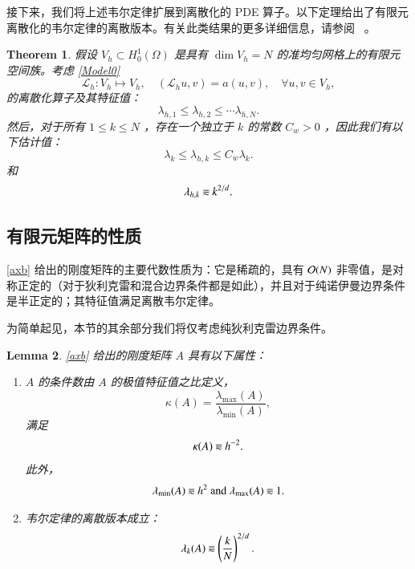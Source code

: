 \documentclass[12pt]{acta_2011xz}
\newcommand{\eqqsim}{\mathbin{\rotatebox[origin=c]{180}{\ensuremath{\cong}}}}
\newtheorem{theorem}{Theorem}[section]
\newtheorem{lemma}[theorem]{Lemma}
\begin{document}
接下来，我们将上述韦尔定律扩展到离散化的 PDE 算子。以下定理给出了有限元离散化的韦尔定律的离散版本。有关此类结果的更多详细信息，请参阅~    \cite{Weyl}    。  

   \begin{theorem}   \label{thm:WeylFE}    假设    $V_h\subset H_0^1({\Omega})$    是具有    $\dim V_h = N$    的准均匀网格上的有限元空间族。考虑    \eqref{Model0}    
   \begin{equation*}
    \mathcal L_h: V_h\mapsto V_h, \quad (\mathcal L_h u, v) = a(u, v), \quad \forall u, v\in V_h,
\end{equation*}    的离散化算子及其特征值：
   \[
\lambda_{h,1}\le \lambda_{h,2}\le \cdots \lambda_{h,N}.
\]    然后，对于所有
   $1\le k\le N$    ，存在一个独立于    $k$    的常数    $C_w>0$    ，因此我们有以下估计值：
   \begin{equation}\label{e:discrete-continuous}
        \lambda_k\le\lambda_{h,k}\le C_w\lambda_k.
    \end{equation}    和 
   \begin{equation}\label{discrete-Weyl}
        \lambda_{h,k}\eqqsim k^{2/d}.
    \end{equation}     \end{theorem}     

   \subsection{有限元矩阵的性质  }       \eqref{axb}    给出的刚度矩阵的主要代数性质为：它是稀疏的，具有    ${\cal O}(N)$    非零值，是对称正定的（对于狄利克雷和混合边界条件都是如此），并且对于纯诺伊曼边界条件是半正定的；其特征值满足离散韦尔定律。  

为简单起见，本节的其余部分我们将仅考虑纯狄利克雷边界条件。
   \begin{lemma}   \label{lm:stiffness}       \eqref{axb}    给出的刚度矩阵    $A$    具有以下属性：
   \begin{enumerate}

   \item            $A$          的条件数由          $A$          的极值特征值之比定义，
         $$
\kappa(A)=\frac{\lambda_{\max}(A)}{\lambda_{\min}(A)},
$$          满足
         $$
\kappa(A) \eqqsim h^{-2}.
$$          此外，
         $$
\lambda_{\min}(A) \eqqsim h^2 \mbox{ and } \lambda_{\max}(A)\eqqsim 1.
$$            \item   韦尔定律的离散版本成立：
         $$
        \lambda_k(A)\eqqsim \left(\frac{k}{N}\right)^{2/d}.
$$           \end{enumerate}     \end{lemma}     
\end{document}
